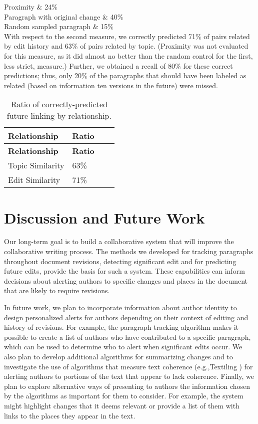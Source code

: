 Proximity \& 24\%\\

Paragraph with original change \& 40\%\\

Random sampled paragraph \& 15\%\\

With respect to the second measure, we correctly predicted 71\% of pairs
related by edit history and 63\% of pairs related by topic. (Proximity
was not evaluated for this measure, as it did almost no better than the
random control for the first, less strict, measure.) Further, we
obtained a recall of 80\% for these correct predictions; thus, only 20\%
of the paragraphs that should have been labeled as related (based on
information ten versions in the future) were missed.

\begin{longtable}[c]{@{}llll@{}}
\caption{Ratio of correctly-predicted future linking by
relationship.{}}\tabularnewline
\toprule
\textbf{Relationship} & \textbf{Ratio} & &\tabularnewline
\midrule
\endfirsthead
\toprule
\textbf{Relationship} & \textbf{Ratio} & &\tabularnewline
\midrule
\endhead
Topic Similarity & 63\% & &\tabularnewline
Edit Similarity & 71\% & &\tabularnewline
\bottomrule
\end{longtable}

\section{Discussion and Future Work}\label{discussion-and-future-work}

Our long-term goal is to build a collaborative system that will improve
the collaborative writing process. The methods we developed for tracking
paragraphs throughout document revisions, detecting significant edit and
for predicting future edits, provide the basis for such a system. These
capabilities can inform decisions about alerting authors to specific
changes and places in the document that are likely to require revisions.

In future work, we plan to incorporate information about author identity
to design personalized alerts for authors depending on their context of
editing and history of revisions. For example, the paragraph tracking
algorithm makes it possible to create a list of authors who have
contributed to a specific paragraph, which can be used to determine who
to alert when significant edits occur. We also plan to develop
additional algorithms for summarizing changes and to investigate the use
of algorithms that measure text coherence (e.g.,Textiling
\cite{hearst1994multi}) for alerting authors to portions of the text
that appear to lack coherence. Finally, we plan to explore alternative
ways of presenting to authors the information chosen by the algorithms
as important for them to consider. For example, the system might
highlight changes that it deems relevant or provide a list of them with
links to the places they appear in the text.
